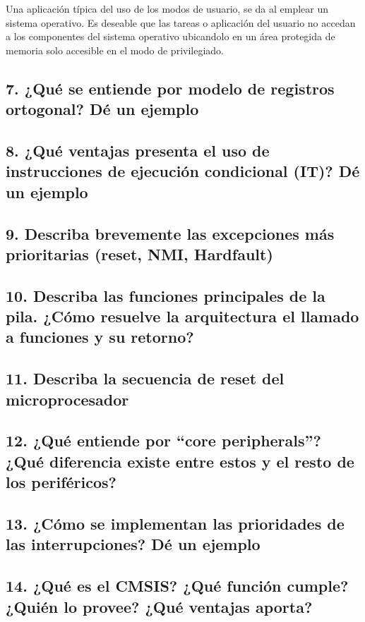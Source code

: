\documentclass[10pt,a4paper,twoside,spanish]{article}	%
\begin{document}
Una aplicación típica del uso de los modos de usuario, se da al emplear un sistema operativo. Es deseable que las tareas o aplicación del usuario no accedan a los componentes del sistema operativo ubicandolo en un área protegida de memoria solo accesible en el modo de privilegiado.     

\subsection*{7. ¿Qué se entiende por modelo de registros ortogonal? Dé un ejemplo}

\subsection*{8. ¿Qué ventajas presenta el uso de instrucciones de ejecución condicional (IT)? Dé un ejemplo}

\subsection*{9. Describa brevemente las excepciones más prioritarias (reset, NMI, Hardfault)}

\subsection*{10. Describa las funciones principales de la pila. ¿Cómo resuelve la arquitectura el llamado a funciones y su retorno?}

\subsection*{11. Describa la secuencia de reset del microprocesador}
\subsection*{12. ¿Qué entiende por “core peripherals”? ¿Qué diferencia existe entre estos y el resto de los periféricos?}

\subsection*{13. ¿Cómo se implementan las prioridades de las interrupciones? Dé un ejemplo}

\subsection*{14. ¿Qué es el CMSIS? ¿Qué función cumple? ¿Quién lo provee? ¿Qué ventajas aporta?}
\end{document}
